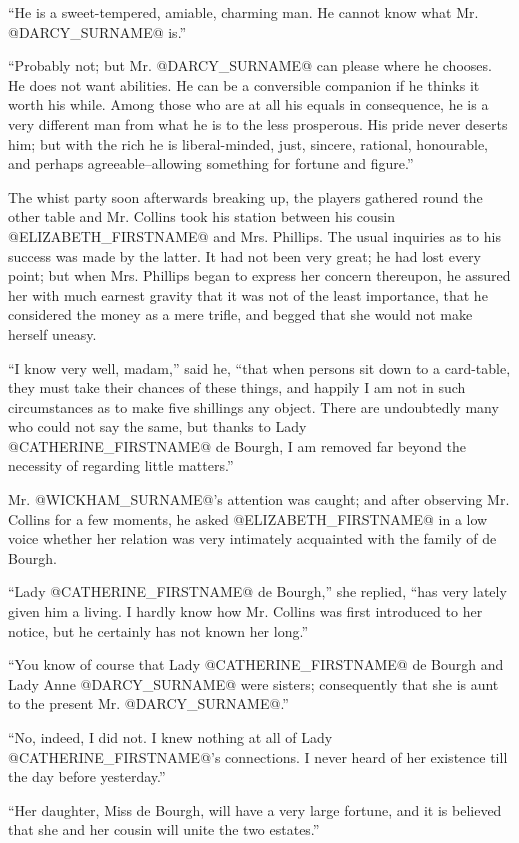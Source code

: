 ``He is a sweet-tempered, amiable, charming man. He cannot know what Mr.
@DARCY_SURNAME@ is.''

``Probably not; but Mr. @DARCY_SURNAME@ can please where he chooses. He does not
want abilities. He can be a conversible companion if he thinks it worth
his while. Among those who are at all his equals in consequence, he is
a very different man from what he is to the less prosperous. His
pride never deserts him; but with the rich he is liberal-minded, just,
sincere, rational, honourable, and perhaps agreeable--allowing something
for fortune and figure.''

The whist party soon afterwards breaking up, the players gathered round
the other table and Mr. Collins took his station between his cousin
@ELIZABETH_FIRSTNAME@ and Mrs. Phillips. The usual inquiries as to his success was
made by the latter. It had not been very great; he had lost every
point; but when Mrs. Phillips began to express her concern thereupon,
he assured her with much earnest gravity that it was not of the least
importance, that he considered the money as a mere trifle, and begged
that she would not make herself uneasy.

``I know very well, madam,'' said he, ``that when persons sit down to a
card-table, they must take their chances of these things, and happily I
am not in such circumstances as to make five shillings any object. There
are undoubtedly many who could not say the same, but thanks to Lady
@CATHERINE_FIRSTNAME@ de Bourgh, I am removed far beyond the necessity of regarding
little matters.''

Mr. @WICKHAM_SURNAME@'s attention was caught; and after observing Mr. Collins for
a few moments, he asked @ELIZABETH_FIRSTNAME@ in a low voice whether her relation
was very intimately acquainted with the family of de Bourgh.

``Lady @CATHERINE_FIRSTNAME@ de Bourgh,'' she replied, ``has very lately given him
a living. I hardly know how Mr. Collins was first introduced to her
notice, but he certainly has not known her long.''

``You know of course that Lady @CATHERINE_FIRSTNAME@ de Bourgh and Lady Anne @DARCY_SURNAME@
were sisters; consequently that she is aunt to the present Mr. @DARCY_SURNAME@.''

``No, indeed, I did not. I knew nothing at all of Lady @CATHERINE_FIRSTNAME@'s
connections. I never heard of her existence till the day before
yesterday.''

``Her daughter, Miss de Bourgh, will have a very large fortune, and it is
believed that she and her cousin will unite the two estates.''

